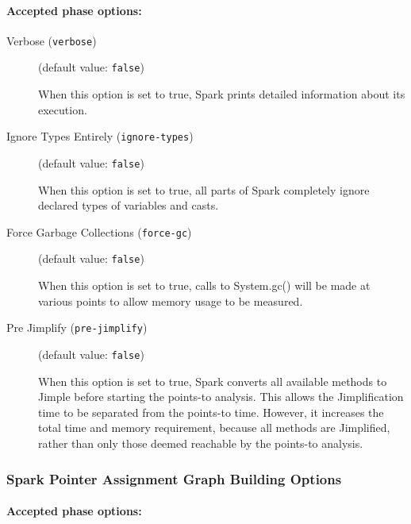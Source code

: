 \documentclass{article}
\begin{document}
\paragraph{Accepted phase options:} 

\begin{description}

\item[Verbose ({\tt verbose})]
(default value: {\tt false})




When this option is set to true, Spark prints detailed information about its execution.
        


\item[Ignore Types Entirely ({\tt ignore-types})]
(default value: {\tt false})




When this option is set to true, all parts of Spark completely ignore
declared types of variables and casts.
        


\item[Force Garbage Collections ({\tt force-gc})]
(default value: {\tt false})




When this option is set to true, calls to System.gc() will be made at
various points to allow memory usage to be measured.
        


\item[Pre Jimplify ({\tt pre-jimplify})]
(default value: {\tt false})




When this option is set to true, Spark converts all available methods to Jimple
before starting the points-to analysis. This allows the Jimplification
time to be separated from the points-to time. However, it increases the
total time and memory requirement, because all methods are Jimplified,
rather than only those deemed reachable by the points-to analysis.
        


\end{description}

\subsubsection{Spark Pointer Assignment Graph Building Options}


\paragraph{Accepted phase options:} 
\end{document}
